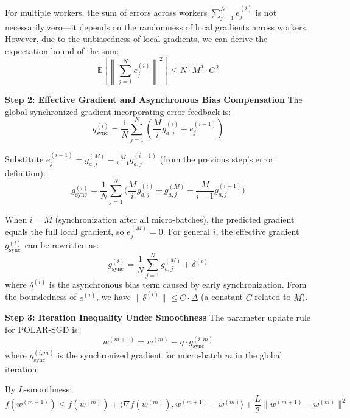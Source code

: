 For multiple workers, the sum of errors across workers $\sum_{j=1}^N e_j^{(i)}$ is not necessarily zero—it depends on the randomness of local gradients across workers. However, due to the unbiasedness of local gradients, we can derive the expectation bound of the sum:
\begin{equation}
\mathbb{E}\left[\left\|\sum_{j=1}^N e_j^{(i)}\right\|^2\right] \leq N \cdot M^2 \cdot G^2
\end{equation}

\textbf{Step 2: Effective Gradient and Asynchronous Bias Compensation}
The global synchronized gradient incorporating error feedback is:
\begin{equation}
g_{\text{sync}}^{(i)} = \frac{1}{N}\sum_{j=1}^N \left(\frac{M}{i}g_{a,j}^{(i)} + e_j^{(i-1)}\right)
\end{equation}

Substitute $e_j^{(i-1)} = g_{a,j}^{(M)} - \frac{M}{i-1}g_{a,j}^{(i-1)}$ (from the previous step's error definition):
\begin{equation}
g_{\text{sync}}^{(i)} = \frac{1}{N}\sum_{j=1}^N \Bigg(\frac{M}{i}g_{a,j}^{(i)} + g_{a,j}^{(M)} - \frac{M}{i-1}g_{a,j}^{(i-1)}\Bigg)
\end{equation}

When $i = M$ (synchronization after all micro-batches), the predicted gradient equals the full local gradient, so $e_j^{(M)} = 0$. For general $i$, the effective gradient $g_{\text{sync}}^{(i)}$ can be rewritten as:
\begin{equation}
g_{\text{sync}}^{(i)} = \frac{1}{N}\sum_{j=1}^N g_{a,j}^{(M)} + \delta^{(i)}
\end{equation}
where $\delta^{(i)}$ is the asynchronous bias term caused by early synchronization. From the boundedness of $e^{(i)}$, we have $\|\delta^{(i)}\| \leq C \cdot \Delta$ (a constant $C$ related to $M$).

\textbf{Step 3: Iteration Inequality Under Smoothness}
The parameter update rule for POLAR-SGD is:
\begin{equation}
w^{(m+1)} = w^{(m)} - \eta \cdot g_{\text{sync}}^{(i,m)}
\end{equation}
where $g_{\text{sync}}^{(i,m)}$ is the synchronized gradient for micro-batch $m$ in the global iteration.

By $L$-smoothness:
\begin{equation}
f(w^{(m+1)}) \leq f(w^{(m)}) + \langle \nabla f(w^{(m)}), w^{(m+1)} - w^{(m)} \rangle + \frac{L}{2}\|w^{(m+1)} - w^{(m)}\|^2
\end{equation}

